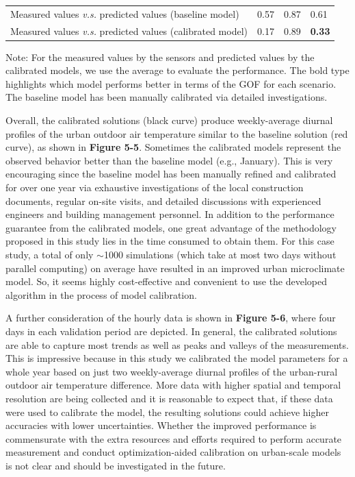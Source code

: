 \begin{table}[]
\begin{center}
{\begin{tabular}{llll}
Measured values \textit{v.s.} predicted values (baseline model)   & 0.57          & 0.87     & 0.61          \\
Measured values \textit{v.s.} predicted values (calibrated model) & 0.17          & 0.89     & \textbf{0.33} \\
\bottomrule
\end{tabular}
}
\end{center}
Note: For the measured values by the sensors and predicted values by the calibrated models, we use the average to evaluate the performance. The bold type highlights which model performs better in terms of the GOF for each scenario. The baseline model has been manually calibrated via detailed investigations.
\end{table}

Overall, the calibrated solutions (black curve) produce weekly-average diurnal profiles of the urban outdoor air temperature similar to the baseline solution (red curve), as shown in \textbf{Figure 5-5}. Sometimes the calibrated models represent the observed behavior better than the baseline model (e.g., January). This is very encouraging since the baseline model has been manually refined and calibrated for over one year via exhaustive investigations of the local construction documents, regular on-site visits, and detailed discussions with experienced engineers and building management personnel. In addition to the performance guarantee from the calibrated models, one great advantage of the methodology proposed in this study lies in the time consumed to obtain them. For this case study, a total of only $\sim$1000 simulations (which take at most two days without parallel computing) on average have resulted in an improved urban microclimate model. So, it seems highly cost-effective and convenient to use the developed algorithm in the process of model calibration.

A further consideration of the hourly data is shown in \textbf{Figure 5-6}, where four days in each validation period are depicted. In general, the calibrated solutions are able to capture most trends as well as peaks and valleys of the measurements. This is impressive because in this study we calibrated the model parameters for a whole year based on just two weekly-average diurnal profiles of the urban-rural outdoor air temperature difference. More data with higher spatial and temporal resolution are being collected and it is reasonable to expect that, if these data were used to calibrate the model, the resulting solutions could achieve higher accuracies with lower uncertainties. Whether the improved performance is commensurate with the extra resources and efforts required to perform accurate measurement and conduct optimization-aided calibration on urban-scale models is not clear and should be investigated in the future.


